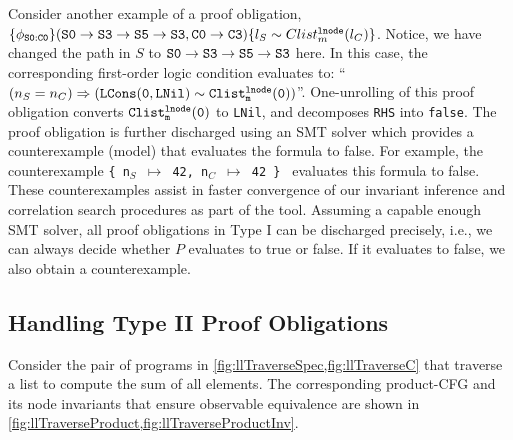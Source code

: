 Consider another example of a proof obligation,
$\{\phi_{{\tt S0:C0}}\} ({\tt S0\rightarrow S3\rightarrow S5\rightarrow S3}, \\{\tt C0\rightarrow C3}) \{l_{S}\sim{}Clist^{{\tt lnode}}_{m}(l_{C})\}$.
Notice, we have changed the path in $S$ to ${\tt S0\rightarrow S3\rightarrow S5\rightarrow S3}$ here.
In this case, the corresponding first-order logic condition evaluates
to: ``$(n_S=n_C)\Rightarrow({\tt LCons(0, LNil)}\sim{}{\tt Clist^{{\tt lnode}}_{m}(0)})$''.
One-unrolling of this proof obligation converts
${\tt Clist^{{\tt lnode}}_{m}(0)}$ to {\tt LNil}, and
decomposes {\tt RHS} into {\tt false}.
The proof obligation is further discharged using an SMT solver
which provides a counterexample (model) that evaluates the
formula to false. For example, the counterexample {\tt \{ n$_S$ $\mapsto$ 42, n$_C$ $\mapsto$ 42 \} }
evaluates this formula to false.
These counterexamples
assist in faster convergence
of our invariant inference and correlation search procedures as part of the \toolName{} tool.
Assuming a capable enough SMT solver,
all proof obligations in Type I can be discharged precisely, i.e.,
we can always decide whether $P$ evaluates to true or false. If it
evaluates to false, we also obtain a counterexample.



\subsection{Handling Type II Proof Obligations}
\label{sec:syn-cat2}

Consider the pair of programs in \cref{fig:llTraverseSpec,fig:llTraverseC}
that traverse a list to compute the sum of all elements.
The corresponding product-CFG and its node
invariants that ensure observable
equivalence are shown in \cref{fig:llTraverseProduct,fig:llTraverseProductInv}.

